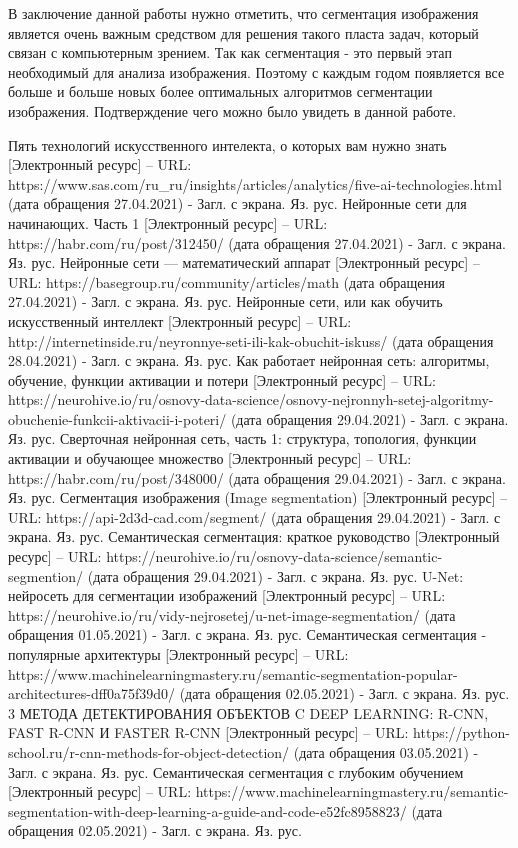 \documentclass[bachelor, och, coursework]{shiza}
\begin{document}
В заключение данной работы нужно отметить, что сегментация изображения является очень важным средством для решения такого пласта задач, который связан с 
компьютерным зрением. Так как сегментация - это первый этап необходимый для анализа изображения. Поэтому с каждым годом появляется все больше и больше 
новых более оптимальных алгоритмов сегментации изображения. Подтверждение чего можно было увидеть в данной работе.

\begin{thebibliography}{3}
    Пять технологий искусственного интелекта, о которых вам нужно знать [Электронный ресурс] – URL: https://www.sas.com/ru_ru/insights/articles/analytics/five-ai-technologies.html (дата обращения 27.04.2021) - Загл. с экрана. Яз. рус.
    Нейронные сети для начинающих. Часть 1 [Электронный ресурс] – URL: https://habr.com/ru/post/312450/ (дата обращения 27.04.2021) - Загл. с экрана. Яз. рус.
    Нейронные сети — математический аппарат [Электронный ресурс] – URL: https://basegroup.ru/community/articles/math (дата обращения 27.04.2021) - Загл. с экрана. Яз. рус.
    Нейронные сети, или как обучить искусственный интеллект [Электронный ресурс] – URL: http://internetinside.ru/neyronnye-seti-ili-kak-obuchit-iskuss/ (дата обращения 28.04.2021) - Загл. с экрана. Яз. рус.
    Как работает нейронная сеть: алгоритмы, обучение, функции активации и потери [Электронный ресурс] – URL: https://neurohive.io/ru/osnovy-data-science/osnovy-nejronnyh-setej-algoritmy-obuchenie-funkcii-aktivacii-i-poteri/ (дата обращения 29.04.2021) - Загл. с экрана. Яз. рус.
    Сверточная нейронная сеть, часть 1: структура, топология, функции активации и обучающее множество [Электронный ресурс] – URL: https://habr.com/ru/post/348000/ (дата обращения 29.04.2021) - Загл. с экрана. Яз. рус.
    Сегментация изображения (Image segmentation) [Электронный ресурс] – URL: https://api-2d3d-cad.com/segment/ (дата обращения 29.04.2021) - Загл. с экрана. Яз. рус.
    Семантическая сегментация: краткое руководство [Электронный ресурс] – URL: https://neurohive.io/ru/osnovy-data-science/semantic-segmention/ (дата обращения 29.04.2021) - Загл. с экрана. Яз. рус.
    U-Net: нейросеть для сегментации изображений [Электронный ресурс] – URL: https://neurohive.io/ru/vidy-nejrosetej/u-net-image-segmentation/ (дата обращения 01.05.2021) - Загл. с экрана. Яз. рус.
    Семантическая сегментация - популярные архитектуры [Электронный ресурс] – URL: https://www.machinelearningmastery.ru/semantic-segmentation-popular-architectures-dff0a75f39d0/ (дата обращения 02.05.2021) - Загл. с экрана. Яз. рус.
    3 МЕТОДА ДЕТЕКТИРОВАНИЯ ОБЪЕКТОВ C DEEP LEARNING: R-CNN, FAST R-CNN И FASTER R-CNN [Электронный ресурс] – URL: https://python-school.ru/r-cnn-methods-for-object-detection/ (дата обращения 03.05.2021) - Загл. с экрана. Яз. рус.
    Семантическая сегментация с глубоким обучением [Электронный ресурс] – URL: https://www.machinelearningmastery.ru/semantic-segmentation-with-deep-learning-a-guide-and-code-e52fc8958823/ (дата обращения 02.05.2021) - Загл. с экрана. Яз. рус.
    
\end{thebibliography}
\end{document}
